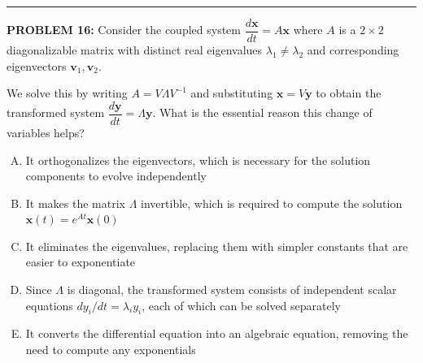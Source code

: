 \documentclass[12pt]{amsart}
\newcommand{\divider}{
  \vspace{-1em} %
  \noindent
  \raisebox{-0.15ex}{\textbullet}%
  \hspace{0.5em}%
  \rule[0.5ex]{0.95\textwidth}{1.0pt}%
  \hspace{0.5em}%
  \raisebox{-0.15ex}{\textbullet}%
  \vspace{0em} %
}
\begin{document}
\divider

{\bf PROBLEM 16:}
%
Consider the coupled system $\dfrac{d\mathbf{x}}{dt} = A\mathbf{x}$ where 
$A$ is a $2 \times 2$ diagonalizable matrix with distinct real eigenvalues 
$\lambda_1 \neq \lambda_2$ and corresponding eigenvectors 
$\mathbf{v}_1, \mathbf{v}_2$.

We solve this by writing $A = V\Lambda V^{-1}$ and substituting 
$\mathbf{x} = V\mathbf{y}$ to obtain the transformed system 
$\dfrac{d\mathbf{y}}{dt} = \Lambda\mathbf{y}$.
%
What is the essential reason this change of variables helps?

\begin{enumerate}[(A)]
\item It orthogonalizes the eigenvectors, which is necessary for the 
      solution components to evolve independently
\item It makes the matrix $\Lambda$ invertible, which is required to 
      compute the solution $\mathbf{x}(t) = e^{At}\mathbf{x}(0)$
\item It eliminates the eigenvalues, replacing them with simpler constants 
      that are easier to exponentiate
\item Since $\Lambda$ is diagonal, the transformed system consists of 
      independent scalar equations $dy_i/dt = \lambda_i y_i$, each of which 
      can be solved separately
\item It converts the differential equation into an algebraic equation, 
      removing the need to compute any exponentials
\end{enumerate}
\end{document}
